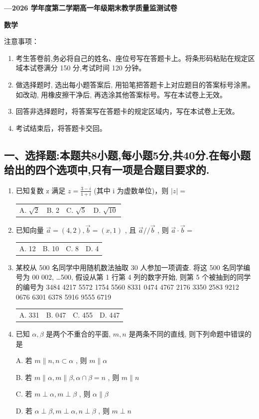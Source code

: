 \documentclass[UTF8,11pt,a4paper]{ctexart}
\makeatletter
\newcommand{\ExamMainTitle}[1]{%
  \begin{center}
    {\heiti\bfseries\fontsize{16pt}{23pt}\selectfont #1\par}
  \end{center}
  \vspace{0.15em}%
}
\newcommand{\ExamSubjectTitle}[1]{%
  \begin{center}
    {\heiti\bfseries\fontsize{22pt}{28pt}\selectfont #1\par}
  \end{center}
  \vspace{0.45em}%
}
\newcommand{\ExamChoicesFour}[4]{%
  \par\smallskip\noindent
  \begin{tabularx}{\linewidth}{@{}>{\raggedright\arraybackslash}X>{\raggedright\arraybackslash}X>{\raggedright\arraybackslash}X>{\raggedright\arraybackslash}X@{}}
    #1 & #2 & #3 & #4
  \end{tabularx}\par\smallskip
}
\newcommand{\ExamChoicesOne}[4]{%
  \par\smallskip\noindent #1\par
  \noindent #2\par
  \noindent #3\par
  \noindent #4\par\smallskip
}
\makeatother
\begin{document}
\color{ExamInk}



\ExamMainTitle{2025---2026 学年度第二学期高一年级期末教学质量监测试卷}

\ExamSubjectTitle{数学}

注意事项：

\begin{enumerate}
\def\labelenumi{\arabic{enumi}.}
\item
  考生答卷前,务必将自己的姓名、座位号写在答题卡上。将条形码粘贴在规定区域本试卷满分 150 分,考试时间 120 分钟。
\item
  做选择题时, 选出每小题答案后, 用铅笔把答题卡上对应题目的答案标号涂黑。如改动, 用橡皮擦干净后, 再选涂其他答案标号。写在本试卷上无效。
\item
  回答非选择题时，将答案写在答题卡的规定区域内，写在本试卷上无效。
\item
  考试结束后，将答题卡交回。
\end{enumerate}

\subsection{一、选择题:本题共8小题,每小题5分,共40分.在每小题给出的四个选项中,只有一项是合题目要求的.}\label{ux4e00ux9009ux62e9ux9898ux672cux9898ux51718ux5c0fux9898ux6bcfux5c0fux98985ux5206ux517140ux5206.ux5728ux6bcfux5c0fux9898ux7ed9ux51faux7684ux56dbux4e2aux9009ux9879ux4e2dux53eaux6709ux4e00ux9879ux662fux5408ux9898ux76eeux8981ux6c42ux7684.}

\begin{enumerate}
\def\labelenumi{\arabic{enumi}.}
\item
  已知复数 z 满足 \(z = \frac{3 - i}{1 + i}\) (其中 i 为虚数单位)，则 \(|z| =\)

  \ExamChoicesFour{A. \(\sqrt{2}\)}{B. 2}{C. \(\sqrt{5}\)}{D. \(\sqrt{10}\)}
\item
  已知向量 \(\vec{a} = (4, 2), \vec{b} = (x, 1)\) , 且 \(\vec{a} // \vec{b}\) , 则 \(\vec{a} \cdot \vec{b} =\)

  \ExamChoicesFour{A. 12}{B. 10}{C. 8}{D. 4}
\item
  某校从 500 名同学中用随机数法抽取 30 人参加一项调查. 将这 500 名同学编号为 00
  002, \ldots500, 假设从第 1 行第 4 列的数字开始, 则第 5 个被抽到的同学的编号为
  3484 4217 5572 1754 5560 8331
  0474 4767 2176 3350 2583 9212
  0676 6301 6378 5916 9555 6719

  \ExamChoicesFour{A. 331}{B. 047}{C. 455}{D. 447}
\item
  已知 \(\alpha, \beta\) 是两个不重合的平面, \(m, n\) 是两条不同的直线, 则下列命题中错误的是

  \ExamChoicesOne{A. 若 \(m \parallel n, n \subset \alpha\) , 则 \(m \parallel \alpha\)}{B. 若 \(m \parallel \alpha, m \parallel \beta, \alpha \cap \beta = n\) , 则 \(m \parallel n\)}{C. 若 \(m \perp \alpha, m \perp \beta\) , 则 \(\alpha \parallel \beta\)}{D. 若 \(\alpha \perp \beta, m \perp \alpha, n \perp \beta\) , 则 \(m \perp n\)}
\end{enumerate}
\end{document}

